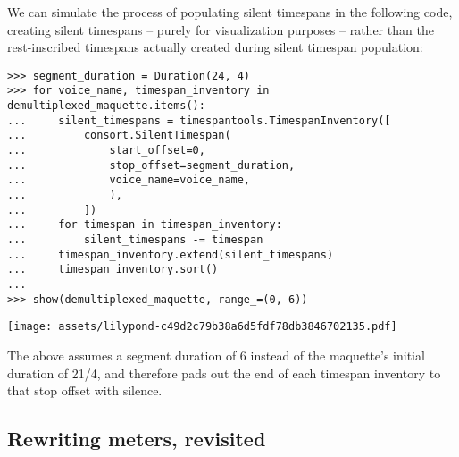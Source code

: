 \noindent We can simulate the process of populating silent timespans in the
following code, creating silent timespans -- purely for visualization purposes
-- rather than the rest-inscribed timespans actually created during silent
timespan population:

\begin{comment}
<abjad>
segment_duration = Duration(24, 4)
for voice_name, timespan_inventory in demultiplexed_maquette.items():
    silent_timespans = timespantools.TimespanInventory([
        consort.SilentTimespan(
            start_offset=0,
            stop_offset=segment_duration,
            voice_name=voice_name,
            ),
        ])
    for timespan in timespan_inventory:
        silent_timespans -= timespan
    timespan_inventory.extend(silent_timespans)
    timespan_inventory.sort()

show(demultiplexed_maquette, range_=(0, 6))
</abjad>
\end{comment}

\begin{abjadbookoutput}
\begin{singlespacing}
\vspace{-0.5\baselineskip}
\begin{lstlisting}
>>> segment_duration = Duration(24, 4)
>>> for voice_name, timespan_inventory in demultiplexed_maquette.items():
...     silent_timespans = timespantools.TimespanInventory([
...         consort.SilentTimespan(
...             start_offset=0,
...             stop_offset=segment_duration,
...             voice_name=voice_name,
...             ),
...         ])
...     for timespan in timespan_inventory:
...         silent_timespans -= timespan
...     timespan_inventory.extend(silent_timespans)
...     timespan_inventory.sort()
...
>>> show(demultiplexed_maquette, range_=(0, 6))
\end{lstlisting}
\noindent\texttt{[image: assets/lilypond-c49d2c79b38a6d5fdf78db3846702135.pdf]}
\end{singlespacing}
\end{abjadbookoutput}

\noindent The above assumes a segment duration of 6 instead of the maquette's
initial duration of 21/4, and therefore pads out the end of each timespan
inventory to that stop offset with silence.

\subsection{Rewriting meters, revisited}
\label{ssec:rewriting-meters-revisited}

